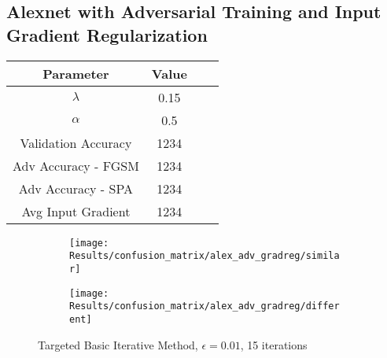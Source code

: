 \documentclass[draft,final]{vutinfth} %
\begin{document}
\subsection{Alexnet with Adversarial Training and Input Gradient Regularization}

\begin{table}[h]
  \centering
  \begin{tabular}{cccc}
    \toprule
			Parameter			& Value   \\
    \midrule
			$\lambda$								& 0.15		\\
			$\alpha$								& 0.5			\\
			
			Validation Accuracy			& 1234			\\ %
			Adv Accuracy - FGSM			& 1234 			\\
			Adv Accuracy - SPA			& 1234			\\
			
			Avg Input Gradient			& 1234			\\
    \bottomrule
  \end{tabular}
\end{table}


\begin{figure}[h]
  \begin{subfigure}[b]{0.5\columnwidth}
		\centering
    \texttt{[image: Results/confusion\_matrix/alex\_adv\_gradreg/similar]}%
    \label{fig:exp:cm:alex_adv_gradreg:similar}
  \end{subfigure}
  \begin{subfigure}[b]{0.5\columnwidth}
		\centering
    \texttt{[image: Results/confusion\_matrix/alex\_adv\_gradreg/different]}
    \label{fig:exp:cm:alex_adv_gradreg:different}
  \end{subfigure}
  \caption{Targeted Basic Iterative Method, $\epsilon = 0.01$, 15 iterations}
  \label{fig:intro} %
\end{figure}

\backmatter

\listoffigures %

\listoftables %

\listofalgorithms
{}

\printindex

\printglossaries



\end{document}
